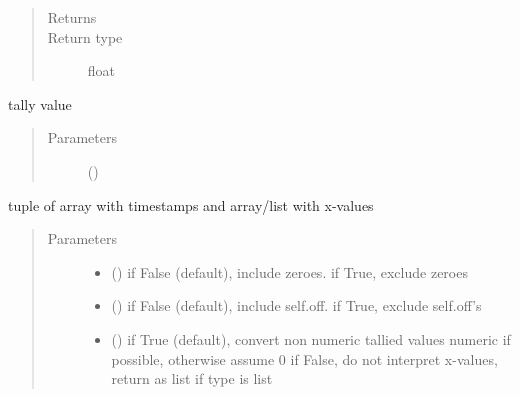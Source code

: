 \documentclass[letterpaper,10pt,english]{sphinxmanual}
\begin{document}
\begin{fulllineitems}
\begin{fulllineitems}
\begin{quote}
\begin{description}
\item[{Returns}] \leavevmode
{}

\item[{Return type}] \leavevmode
float

\end{description}\end{quote}

\end{fulllineitems}


\begin{fulllineitems}
\label{\detokenize{Reference:salabim.MonitorTimestamp.tally}}
tally value
\begin{quote}\begin{description}
\item[{Parameters}] \leavevmode
{} (\sphinxstyleliteralemphasis{, }) \textendash{} 

\end{description}\end{quote}

\end{fulllineitems}


\begin{fulllineitems}
\label{\detokenize{Reference:salabim.MonitorTimestamp.tx}}
tuple of array with timestamps and array/list with x-values
\begin{quote}\begin{description}
\item[{Parameters}] \leavevmode\begin{itemize}
\item {} 
 () \textendash{} if False (default), include zeroes. if True, exclude zeroes

\item {} 
 () \textendash{} if False (default), include self.off. if True, exclude self.off’s

\item {} 
 () \textendash{} if True (default), convert non numeric tallied values numeric if possible, otherwise assume 0 
if False, do not interpret x-values, return as list if type is list


\end{itemize}
\end{description}
\end{quote}
\end{fulllineitems}
\end{fulllineitems}
\end{document}
